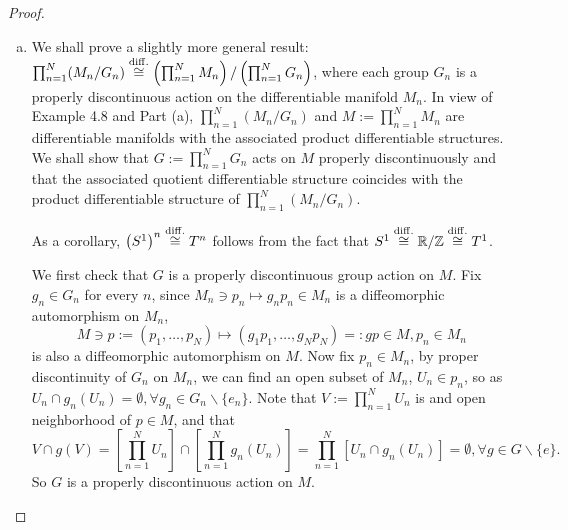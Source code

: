 {\begin{proof}
\begin{enumerate}[(a)]
	\item
	We shall prove a slightly more general result: $\prod_{n=1}^N (M_n/G_n) \stackrel{\mathrm{diff.}}{\cong} \left(\prod_{n=1}^N M_n\right)/\left(\prod_{n=1}^N G_n\right)$, where each group $G_n$ is a properly discontinuous action on the differentiable manifold $M_n$. In view of Example 4.8 and Part (a), $\prod_{n=1}^N (M_n/G_n)$ and $M:= \prod_{n=1}^N M_n$ are differentiable manifolds with the associated product differentiable structures. We shall show that $G:= \prod_{n=1}^N G_n$ acts on $M$ properly discontinuously and that the associated quotient differentiable structure coincides with the product differentiable structure of $\prod_{n=1}^N (M_n/G_n)$.
	\par
	As a corollary, $\left(S^1\right)^n \stackrel{\mathrm{diff.}}{\cong} T^n$ follows from the fact that $S^1 \stackrel{\mathrm{diff.}}{\cong} \mathbb{R}/\mathbb{Z} \stackrel{\mathrm{diff.}}{\cong} T^1$.
	\par
	We first check that $G$ is a properly discontinuous group action on $M$. Fix $g_n \in G_n$ for every $n$, since $M_n \ni p_n \mapsto g_n p_n \in M_n$ is a diffeomorphic automorphism on $M_n$,
	\[ M \ni p:= (p_1,\dots,p_N) \mapsto (g_1 p_1, \dots, g_N p_N) =:g p \in M, p_n \in M_n \]
	is also a diffeomorphic automorphism on $M$. Now fix $p_n \in M_n$, by proper discontinuity of $G_n$ on $M_n$, we can find an open subset of $M_n$, $U_n \in p_n$, so as ${U_n \cap g_n(U_n) = \emptyset}, { \forall g_n \in G_n\backslash\{e_n\} }$. Note that $V:=\prod_{n=1}^{N} U_n$ is and open neighborhood of $p \in M$, and that
	\[V \cap g(V) = \left[\prod_{n=1}^N U_n \right] \cap \left[\prod_{n=1}^N g_n(U_n) \right] = \prod_{n=1}^N \left[U_n \cap g_n(U_n)\right] = \emptyset, \forall g \in G\backslash\{e\}.\]
	So $G$ is a properly discontinuous action on $M$.
	\par

\end{enumerate}
\end{proof}}
